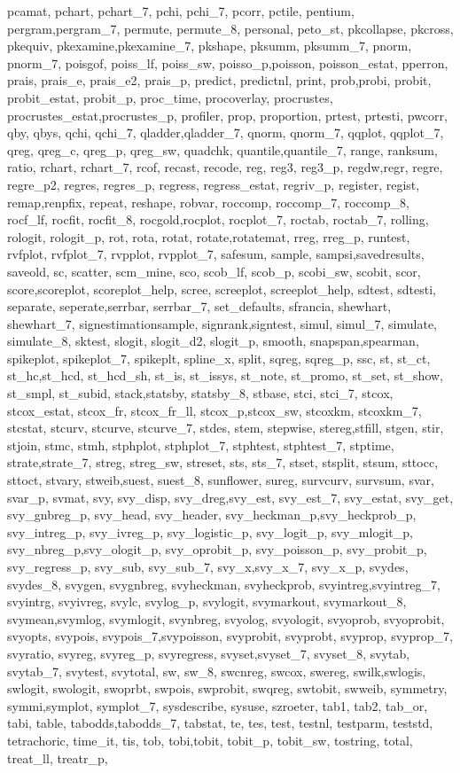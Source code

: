 {{pcamat, pchart, pchart_7, pchi, pchi_7, pcorr, pctile, pentium, pergram,pergram_7, permute, permute_8, personal, peto_st, pkcollapse, pkcross, pkequiv, pkexamine,pkexamine_7, pkshape, pksumm, pksumm_7, pnorm, pnorm_7, poisgof, poiss_lf, poiss_sw, poisso_p,poisson, poisson_estat, pperron, prais, prais_e, prais_e2, prais_p, predict, predictnl, print, prob,probi, probit, probit_estat, probit_p, proc_time, procoverlay, procrustes, procrustes_estat,procrustes_p, profiler, prop, proportion, prtest, prtesti, pwcorr, qby, qbys, qchi, qchi_7, qladder,qladder_7, qnorm, qnorm_7, qqplot, qqplot_7, qreg, qreg_c, qreg_p, qreg_sw, quadchk, quantile,quantile_7, range, ranksum, ratio, rchart, rchart_7, rcof, recast, recode, reg, reg3, reg3_p, regdw,regr, regre, regre_p2, regres, regres_p, regress, regress_estat, regriv_p, register, regist, remap,renpfix, repeat, reshape, robvar, roccomp, roccomp_7, roccomp_8, rocf_lf, rocfit, rocfit_8, rocgold,rocplot, rocplot_7, roctab, roctab_7, rolling, rologit, rologit_p, rot, rota, rotat, rotate,rotatemat, rreg, rreg_p, runtest, rvfplot, rvfplot_7, rvpplot, rvpplot_7, safesum, sample, sampsi,savedresults, saveold, sc, scatter, scm_mine, sco, scob_lf, scob_p, scobi_sw, scobit, scor, score,scoreplot, scoreplot_help, scree, screeplot, screeplot_help, sdtest, sdtesti, separate, seperate,serrbar, serrbar_7, set_defaults, sfrancia, shewhart, shewhart_7, signestimationsample, signrank,signtest, simul, simul_7, simulate, simulate_8, sktest, slogit, slogit_d2, slogit_p, smooth, snapspan,spearman, spikeplot, spikeplot_7, spikeplt, spline_x, split, sqreg, sqreg_p, ssc, st, st_ct, st_hc,st_hcd, st_hcd_sh, st_is, st_issys, st_note, st_promo, st_set, st_show, st_smpl, st_subid, stack,statsby, statsby_8, stbase, stci, stci_7, stcox, stcox_estat, stcox_fr, stcox_fr_ll, stcox_p,stcox_sw, stcoxkm, stcoxkm_7, stcstat, stcurv, stcurve, stcurve_7, stdes, stem, stepwise, stereg,stfill, stgen, stir, stjoin, stmc, stmh, stphplot, stphplot_7, stphtest, stphtest_7, stptime, strate,strate_7, streg, streg_sw, streset, sts, sts_7, stset, stsplit, stsum, sttocc, sttoct, stvary, stweib,suest, suest_8, sunflower, sureg, survcurv, survsum, svar, svar_p, svmat, svy, svy_disp, svy_dreg,svy_est, svy_est_7, svy_estat, svy_get, svy_gnbreg_p, svy_head, svy_header, svy_heckman_p,svy_heckprob_p, svy_intreg_p, svy_ivreg_p, svy_logistic_p, svy_logit_p, svy_mlogit_p, svy_nbreg_p,svy_ologit_p, svy_oprobit_p, svy_poisson_p, svy_probit_p, svy_regress_p, svy_sub, svy_sub_7, svy_x,svy_x_7, svy_x_p, svydes, svydes_8, svygen, svygnbreg, svyheckman, svyheckprob, svyintreg,svyintreg_7, svyintrg, svyivreg, svylc, svylog_p, svylogit, svymarkout, svymarkout_8, svymean,svymlog, svymlogit, svynbreg, svyolog, svyologit, svyoprob, svyoprobit, svyopts, svypois, svypois_7,svypoisson, svyprobit, svyprobt, svyprop, svyprop_7, svyratio, svyreg, svyreg_p, svyregress, svyset,svyset_7, svyset_8, svytab, svytab_7, svytest, svytotal, sw, sw_8, swcnreg, swcox, swereg, swilk,swlogis, swlogit, swologit, swoprbt, swpois, swprobit, swqreg, swtobit, swweib, symmetry, symmi,symplot, symplot_7, sysdescribe, sysuse, szroeter, tab1, tab2, tab_or, tabi, table, tabodds,tabodds_7, tabstat, te, tes, test, testnl, testparm, teststd, tetrachoric, time_it, tis, tob, tobi,tobit, tobit_p, tobit_sw, tostring, total, treat_ll, treatr_p, }}

